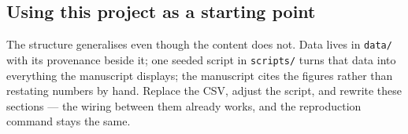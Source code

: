 \subsection{Using this project as a starting point}

The structure generalises even though the content does not. Data lives in
\texttt{data/} with its provenance beside it; one seeded script in
\texttt{scripts/} turns that data into everything the manuscript displays; the
manuscript cites the figures rather than restating numbers by hand. Replace the
CSV, adjust the script, and rewrite these sections --- the wiring between them
already works, and the reproduction command stays the same.

